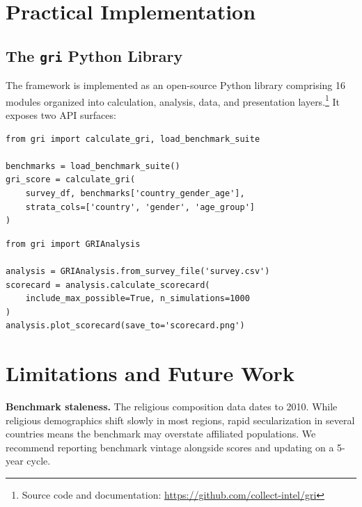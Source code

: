 \documentclass[11pt,a4paper]{article}
\begin{document}
\section{Practical Implementation}

\subsection{The \texttt{gri} Python Library}

The framework is implemented as an open-source Python library comprising 16 modules organized into calculation, analysis, data, and presentation layers.\footnote{Source code and documentation: \url{https://github.com/collect-intel/gri}} It exposes two API surfaces:

\begin{lstlisting}[caption={Functional API for scripted pipelines.},label={lst:functional}]
from gri import calculate_gri, load_benchmark_suite

benchmarks = load_benchmark_suite()
gri_score = calculate_gri(
    survey_df, benchmarks['country_gender_age'],
    strata_cols=['country', 'gender', 'age_group']
)
\end{lstlisting}

\begin{lstlisting}[caption={Object-oriented API for interactive analysis.},label={lst:oo}]
from gri import GRIAnalysis

analysis = GRIAnalysis.from_survey_file('survey.csv')
scorecard = analysis.calculate_scorecard(
    include_max_possible=True, n_simulations=1000
)
analysis.plot_scorecard(save_to='scorecard.png')
\end{lstlisting}

\section{Limitations and Future Work}

\textbf{Benchmark staleness.} The religious composition data dates to 2010. While religious demographics shift slowly in most regions, rapid secularization in several countries means the benchmark may overstate affiliated populations. We recommend reporting benchmark vintage alongside scores and updating on a 5-year cycle.
\end{document}
